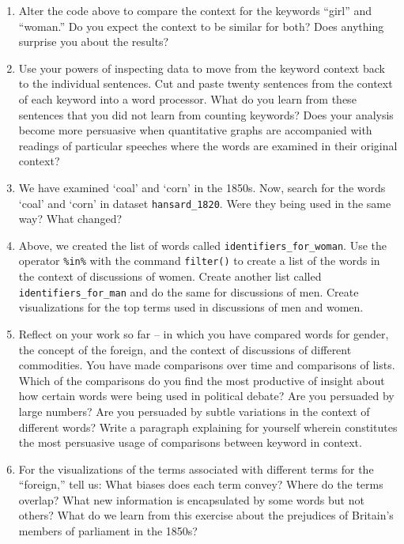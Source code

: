 \documentclass[
]{article}
\begin{document}
\begin{enumerate}
\def\labelenumi{\arabic{enumi})}
\item
  Alter the code above to compare the context for the keywords ``girl''
  and ``woman.'' Do you expect the context to be similar for both? Does
  anything surprise you about the results?
\item
  Use your powers of inspecting data to move from the keyword context
  back to the individual sentences. Cut and paste twenty sentences from
  the context of each keyword into a word processor. What do you learn
  from these sentences that you did not learn from counting keywords?
  Does your analysis become more persuasive when quantitative graphs are
  accompanied with readings of particular speeches where the words are
  examined in their original context?
\item
  We have examined `coal' and `corn' in the 1850s. Now, search for the
  words `coal' and `corn' in dataset \texttt{hansard\_1820}. Were they
  being used in the same way? What changed?
\item
  Above, we created the list of words called
  \texttt{identifiers\_for\_woman}. Use the operator \texttt{\%in\%}
  with the command \texttt{filter()} to create a list of the words in
  the context of discussions of women. Create another list called
  \texttt{identifiers\_for\_man} and do the same for discussions of men.
  Create visualizations for the top terms used in discussions of men and
  women.
\item
  Reflect on your work so far -- in which you have compared words for
  gender, the concept of the foreign, and the context of discussions of
  different commodities. You have made comparisons over time and
  comparisons of lists. Which of the comparisons do you find the most
  productive of insight about how certain words were being used in
  political debate? Are you persuaded by large numbers? Are you
  persuaded by subtle variations in the context of different words?
  Write a paragraph explaining for yourself wherein constitutes the most
  persuasive usage of comparisons between keyword in context.
\item
  For the visualizations of the terms associated with different terms
  for the ``foreign,'' tell us: What biases does each term convey? Where
  do the terms overlap? What new information is encapsulated by some
  words but not others? What do we learn from this exercise about the
  prejudices of Britain's members of parliament in the 1850s?
\end{enumerate}
\end{document}

